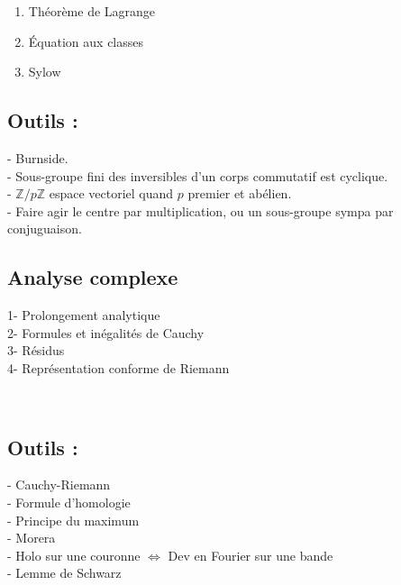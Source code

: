 \documentclass[12pt,a4paper]{article}
\begin{document}
\begin{enumerate}
\item Théorème de Lagrange
\item Équation aux classes
\item Sylow
\end{enumerate}
\subsection*{Outils :}
- Burnside. \\
- Sous-groupe fini des inversibles d'un corps commutatif est cyclique. \\
- $\mathbb{Z}/p\mathbb{Z}$ espace vectoriel quand $p$ premier et abélien. \\
- Faire agir le centre par multiplication, ou un sous-groupe sympa par conjuguaison.




\newpage
\begin{center}
\section*{Analyse complexe} 
\end{center}

1- Prolongement analytique \\

2- Formules et inégalités de Cauchy \\

3- Résidus \\

4- Représentation conforme de Riemann

~\\

\subsection*{Outils :}
- Cauchy-Riemann \\

- Formule d'homologie \\

- Principe du maximum \\

- Morera \\

- Holo sur une couronne $\Leftrightarrow$ Dev en Fourier sur une bande \\

- Lemme de Schwarz \\
\end{document}
